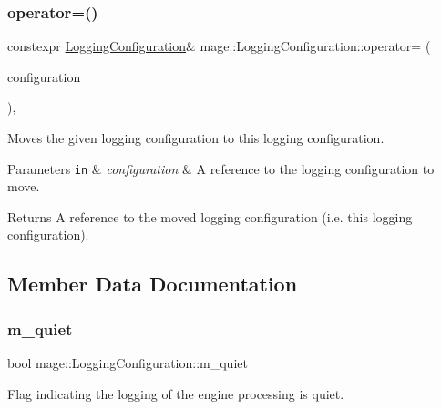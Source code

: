 \subsubsection{\texorpdfstring{operator=()}{operator=()}\hspace{0.1cm}{\footnotesize\ttfamily [2/2]}}
{\footnotesize\ttfamily constexpr \hyperlink{classmage_1_1_logging_configuration}{Logging\+Configuration}\& mage\+::\+Logging\+Configuration\+::operator= (\begin{DoxyParamCaption}\item[{\hyperlink{classmage_1_1_logging_configuration}{Logging\+Configuration} \&\&}]{configuration }\end{DoxyParamCaption})\hspace{0.3cm}{\ttfamily [default]}, {\ttfamily [noexcept]}}

Moves the given logging configuration to this logging configuration.


\begin{DoxyParams}[1]{Parameters}
\mbox{\tt in}  & {\em configuration} & A reference to the logging configuration to move. \\
\hline
\end{DoxyParams}
\begin{DoxyReturn}{Returns}
A reference to the moved logging configuration (i.\+e. this logging configuration). 
\end{DoxyReturn}


\subsection{Member Data Documentation}
\hypertarget{classmage_1_1_logging_configuration_a38f457d5db84d15e008841ca8653b47c}{}\label{classmage_1_1_logging_configuration_a38f457d5db84d15e008841ca8653b47c} 
\subsubsection{\texorpdfstring{m\+\_\+quiet}{m\_quiet}}
{\footnotesize\ttfamily bool mage\+::\+Logging\+Configuration\+::m\+\_\+quiet\hspace{0.3cm}{\ttfamily [private]}}

Flag indicating the logging of the engine processing is quiet. \hypertarget{classmage_1_1_logging_configuration_a60f052c2bb702d8153188e93f00427ac}{}\label{classmage_1_1_logging_configuration_a60f052c2bb702d8153188e93f00427ac} 
